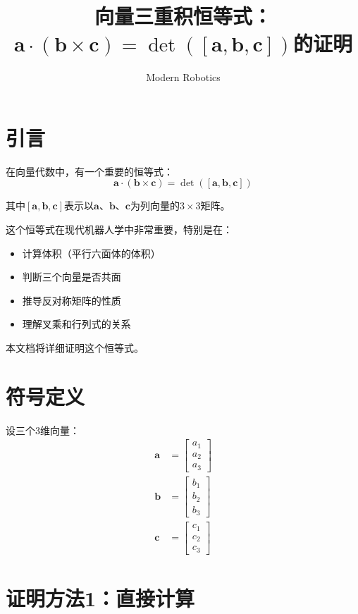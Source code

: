 \documentclass[12pt,a4paper]{article}
\title{向量三重积恒等式：$\bm{a} \cdot (\bm{b} \times \bm{c}) = \det([\bm{a}, \bm{b}, \bm{c}])$的证明}
\author{Modern Robotics}
\date{}
\begin{document}
\maketitle

\section{引言}

在向量代数中，有一个重要的恒等式：
\begin{equation}
\bm{a} \cdot (\bm{b} \times \bm{c}) = \det([\bm{a}, \bm{b}, \bm{c}])
\label{eq:main_identity}
\end{equation}

其中$[\bm{a}, \bm{b}, \bm{c}]$表示以$\bm{a}$、$\bm{b}$、$\bm{c}$为列向量的$3 \times 3$矩阵。

这个恒等式在现代机器人学中非常重要，特别是在：
\begin{itemize}
\item 计算体积（平行六面体的体积）
\item 判断三个向量是否共面
\item 推导反对称矩阵的性质
\item 理解叉乘和行列式的关系
\end{itemize}

本文档将详细证明这个恒等式。

\section{符号定义}

设三个3维向量：
\begin{align}
\bm{a} &= \begin{bmatrix} a_1 \\ a_2 \\ a_3 \end{bmatrix} \\
\bm{b} &= \begin{bmatrix} b_1 \\ b_2 \\ b_3 \end{bmatrix} \\
\bm{c} &= \begin{bmatrix} c_1 \\ c_2 \\ c_3 \end{bmatrix}
\end{align}

\section{证明方法1：直接计算}
\end{document}

